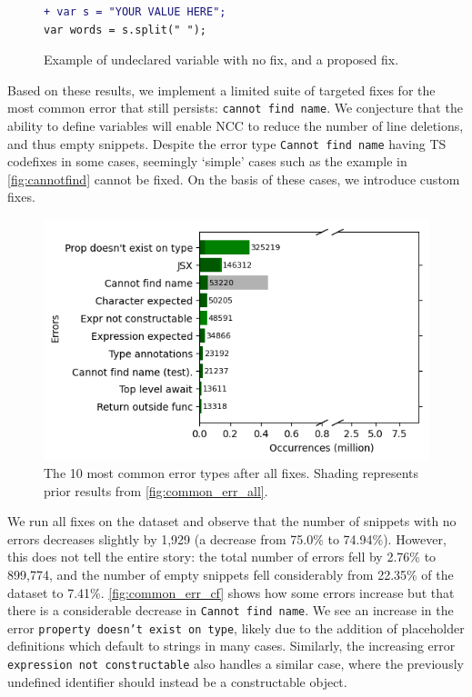 \documentclass[conference]{IEEEtran}
\begin{document}
\begin{figure}[h]
\begin{lstlisting}[language=diff]
+ var s = "YOUR VALUE HERE";
var words = s.split(" ");
    \end{lstlisting}
    \caption{Example of undeclared variable with no fix, and a proposed fix.}
    \label{fig:cannotfind}
\end{figure}


Based on these results, we implement a limited suite of targeted fixes for the most common error that still persists: \texttt{cannot find name}. We conjecture that the ability to define variables will enable NCC to reduce the number of line deletions, and thus empty snippets. Despite the error type \texttt{Cannot find name} having TS codefixes in some cases, seemingly `simple' cases such as the example in \autoref{fig:cannotfind} cannot be fixed. On the basis of these cases, we introduce custom fixes.

\begin{figure}[h]
    \centering
    \includegraphics[width=0.8\linewidth]{images/commonErrorTypesCfFixes.png}
    \caption{The 10 most common error types after all fixes. Shading represents prior results from \autoref{fig:common_err_all}.}
    \label{fig:common_err_cf}
\end{figure}

We run all fixes on the dataset and observe that the number of snippets with no errors decreases slightly by 1,929 (a decrease from 75.0\% to 74.94\%). However, this does not tell the entire story: the total number of errors fell by 2.76\% to 899,774, and the number of empty snippets fell considerably from 22.35\% of the dataset to 7.41\%. \autoref{fig:common_err_cf} shows how some errors increase but that there is a considerable decrease in \texttt{Cannot find name}. We see an increase in the error \texttt{property doesn't exist on type}, likely due to the addition of placeholder definitions which default to strings in many cases. Similarly, the increasing error \texttt{expression not constructable} also handles a similar case, where the previously undefined identifier should instead be a constructable object.
\end{document}
